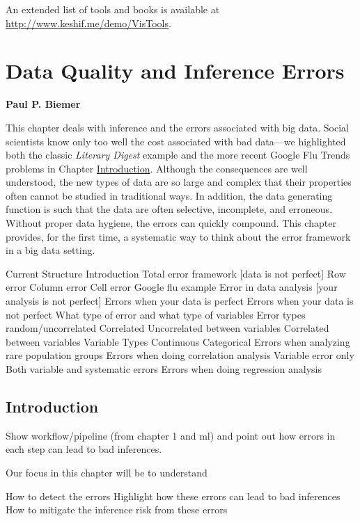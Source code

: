 \documentclass[]{krantz}
\begin{document}
An extended list of tools and books is available at
\url{http://www.keshif.me/demo/VisTools}.


\chapter{Data Quality and Inference Errors}\label{chap:errors}

\textbf{Paul P. Biemer}

This chapter deals with inference and the errors associated with big
data. Social scientists know only too well the cost associated with bad
data---we highlighted both the classic \emph{Literary Digest} example
and the more recent Google Flu Trends problems in Chapter
\protect\hyperlink{chap:intro}{Introduction}. Although the consequences
are well understood, the new types of data are so large and complex that
their properties often cannot be studied in traditional ways. In
addition, the data generating function is such that the data are often
selective, incomplete, and erroneous. Without proper data hygiene, the
errors can quickly compound. This chapter provides, for the first time,
a systematic way to think about the error framework in a big data
setting.

Current Structure Introduction Total error framework {[}data is not
perfect{]} Row error Column error Cell error Google flu example Error in
data analysis {[}your analysis is not perfect{]} Errors when your data
is perfect Errors when your data is not perfect What type of error and
what type of variables Error types random/uncorrelated Correlated
Uncorrelated between variables Correlated between variables Variable
Types Continuous Categorical Errors when analyzing rare population
groups Errors when doing correlation analysis Variable error only Both
variable and systematic errors Errors when doing regression analysis

\hypertarget{sec:10-1}{\section{Introduction}\label{sec:10-1}}

Show workflow/pipeline (from chapter 1 and ml) and point out how errors
in each step can lead to bad inferences.

Our focus in this chapter will be to understand

How to detect the errors Highlight how these errors can lead to bad
inferences How to mitigate the inference risk from these errors
\end{document}
